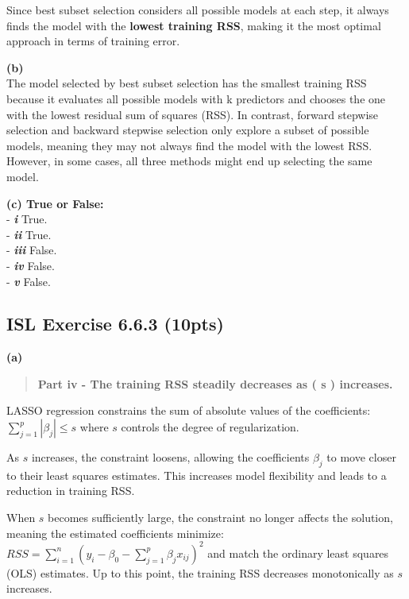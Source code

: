 \documentclass[
  letterpaper,
  DIV=11,
  numbers=noendperiod]{scrartcl}
\begin{document}
Since best subset selection considers all possible models at each step,
it always finds the model with the \textbf{lowest training RSS}, making
it the most optimal approach in terms of training error.

\textbf{(b)}\\
The model selected by best subset selection has the smallest training
RSS because it evaluates all possible models with k predictors and
chooses the one with the lowest residual sum of squares (RSS). In
contrast, forward stepwise selection and backward stepwise selection
only explore a subset of possible models, meaning they may not always
find the model with the lowest RSS. However, in some cases, all three
methods might end up selecting the same model.

\textbf{(c) True or False:}\\
- \textbf{\emph{i}} True.\\
- \textbf{\emph{ii}} True.\\
- \textbf{\emph{iii}} False.\\
- \textbf{\emph{iv}} False.\\
- \textbf{\emph{v}} False.

\subsection{ISL Exercise 6.6.3 (10pts)}\label{isl-exercise-6.6.3-10pts}

\textbf{(a)}

\begin{quote}
\textbf{Part iv - The training RSS steadily decreases as ( s )
increases.}
\end{quote}

LASSO regression constrains the sum of absolute values of the
coefficients: \(\sum_{j=1}^{p} |\beta_j| \leq s\) where \(s\) controls
the degree of regularization.

As \(s\) increases, the constraint loosens, allowing the coefficients
\(\beta_j\) to move closer to their least squares estimates. This
increases model flexibility and leads to a reduction in training RSS.

When \(s\) becomes sufficiently large, the constraint no longer affects
the solution, meaning the estimated coefficients minimize:
\(RSS = \sum_{i=1}^{n} \left( y_i - \beta_0 - \sum_{j=1}^{p} \beta_j x_{ij} \right)^2\)
and match the ordinary least squares (OLS) estimates. Up to this point,
the training RSS decreases monotonically as \(s\) increases.
\end{document}
